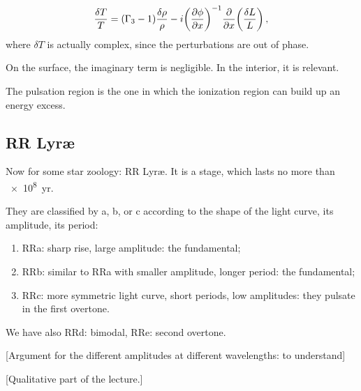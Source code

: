\documentclass[main.tex]{subfiles}
\begin{document}
%
\begin{equation}
  \frac{\delta T}{T} = (\Gamma_3 -1 ) \frac{\delta \rho }{\rho } - i \qty(\pdv{\phi }{x} )^{-1} \pdv{}{x} \qty(\frac{\delta L}{L})
\,,
\end{equation}
%
where \(\delta T\) is actually complex, since the perturbations are out of phase.

On the surface, the imaginary term is negligible. In the interior, it is relevant.

The pulsation region is the one in which the ionization region can build up an energy excess. 

\subsection{RR Lyr\ae}

Now for some star zoology: RR Lyr\ae.
It is a stage, which lasts no more than \SI{e8}{yr}.

They are classified by a, b, or c according to the shape of the light curve, its amplitude, its period:

\begin{enumerate}
  \item RRa: sharp rise, large amplitude: the fundamental;
  \item RRb: similar to RRa with smaller amplitude, longer period: the fundamental;
  \item RRc: more symmetric light curve, short periods, low amplitudes: they pulsate in the first overtone.
\end{enumerate}

We have also RRd: bimodal, RRe: second overtone.

[Argument for the different amplitudes at different wavelengths: to understand]

[Qualitative part of the lecture.]
\end{document}
